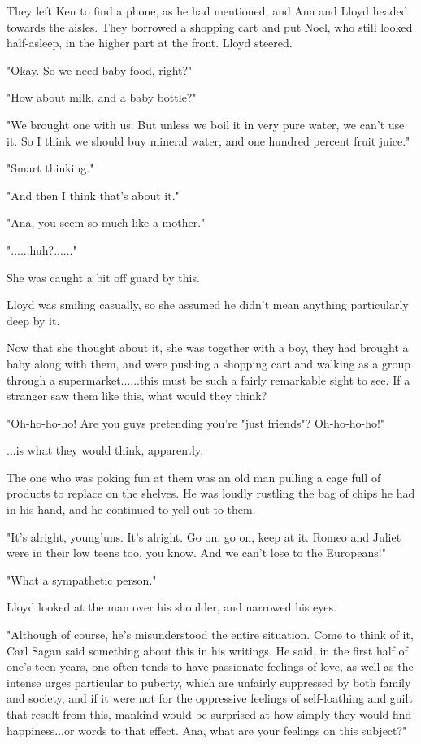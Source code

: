 \documentclass[
]{article}
\begin{document}
They left Ken to find a phone, as he had mentioned, and Ana and Lloyd
headed towards the aisles. They borrowed a shopping cart and put Noel,
who still looked half-asleep, in the higher part at the front. Lloyd
steered.

"Okay. So we need baby food, right?"

"How about milk, and a baby bottle?"

"We brought one with us. But unless we boil it in very pure water, we
can't use it. So I think we should buy mineral water, and one hundred
percent fruit juice."

"Smart thinking."

"And then I think that's about it."

"Ana, you seem so much like a mother."

"......huh?......"

She was caught a bit off guard by this.

Lloyd was smiling casually, so she assumed he didn't mean anything
particularly deep by it.

Now that she thought about it, she was together with a boy, they had
brought a baby along with them, and were pushing a shopping cart and
walking as a group through a supermarket......this must be such a fairly
remarkable sight to see. If a stranger saw them like this, what would
they think?

"Oh-ho-ho-ho! Are you guys pretending you're "just friends"?
Oh-ho-ho-ho!"

...is what they would think, apparently.

The one who was poking fun at them was an old man pulling a cage full of
products to replace on the shelves. He was loudly rustling the bag of
chips he had in his hand, and he continued to yell out to them.

"It's alright, young'uns. It's alright. Go on, go on, keep at it. Romeo
and Juliet were in their low teens too, you know. And we can't lose to
the Europeans!"

"What a sympathetic person."

Lloyd looked at the man over his shoulder, and narrowed his eyes.

"Although of course, he's misunderstood the entire situation. Come to
think of it, Carl Sagan said something about this in his writings. He
said, in the first half of one's teen years, one often tends to have
passionate feelings of love, as well as the intense urges particular to
puberty, which are unfairly suppressed by both family and society, and
if it were not for the oppressive feelings of self-loathing and guilt
that result from this, mankind would be surprised at how simply they
would find happiness...or words to that effect. Ana, what are your
feelings on this subject?"
\end{document}
